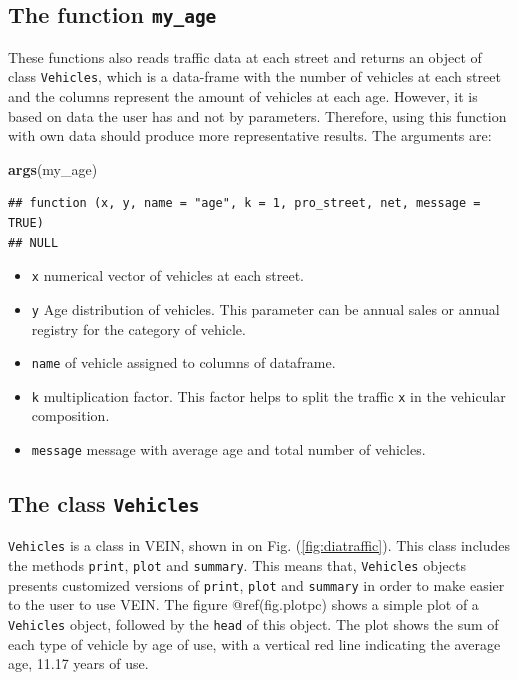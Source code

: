 \documentclass[12pt,graybox,envcountchap,sectrefs]{krantz}
\makeatletter
\newenvironment{Shaded}{\begin{snugshade}}{\end{snugshade}}
\newcommand{\KeywordTok}[1]{\textcolor[rgb]{0.13,0.29,0.53}{\textbf{#1}}}
\newcommand{\NormalTok}[1]{#1}
\providecommand{\tightlist}{%
  \setlength{\itemsep}{0pt}\setlength{\parskip}{0pt}}
\newenvironment{kframe}{%
\medskip{}
\setlength{\fboxsep}{.8em}
 \def\at@end@of@kframe{}%
 \ifinner\ifhmode%
  \def\at@end@of@kframe{\end{minipage}}%
  \begin{minipage}{\columnwidth}%
 \fi\fi%
 \def\FrameCommand##1{\hskip\@totalleftmargin \hskip-\fboxsep
 \colorbox{shadecolor}{##1}\hskip-\fboxsep
     \hskip-\linewidth \hskip-\@totalleftmargin \hskip\columnwidth}%
 \MakeFramed {\advance\hsize-\width
   \@totalleftmargin\z@ \linewidth\hsize
   \@setminipage}}%
 {\par\unskip\endMakeFramed%
 \at@end@of@kframe}
\renewenvironment{Shaded}{\begin{kframe}}{\end{kframe}}
\theoremstyle{definition}
\theoremstyle{definition}
\theoremstyle{definition}
\theoremstyle{remark}
\makeatother
\begin{document}
\subsection{\texorpdfstring{The function
\texttt{my\_age}}{The function my\_age}}\label{the-function-my_age}

These functions also reads traffic data at each street and returns an
object of class \texttt{Vehicles}, which is a data-frame with the number
of vehicles at each street and the columns represent the amount of
vehicles at each age. However, it is based on data the user has and not
by parameters. Therefore, using this function with own data should
produce more representative results. The arguments are:

\begin{Shaded}
\begin{Highlighting}[]
\KeywordTok{args}\NormalTok{(my_age)}
\end{Highlighting}
\end{Shaded}

\begin{verbatim}
## function (x, y, name = "age", k = 1, pro_street, net, message = TRUE) 
## NULL
\end{verbatim}

\begin{itemize}
\tightlist
\item
  \texttt{x} numerical vector of vehicles at each street.
\item
  \texttt{y} Age distribution of vehicles. This parameter can be annual
  sales or annual registry for the category of vehicle.
\item
  \texttt{name} of vehicle assigned to columns of dataframe.
\item
  \texttt{k} multiplication factor. This factor helps to split the
  traffic \texttt{x} in the vehicular composition.
\item
  \texttt{message} message with average age and total number of
  vehicles.
\end{itemize}

\subsection{\texorpdfstring{The class
\texttt{Vehicles}}{The class Vehicles}}\label{the-class-vehicles}

\texttt{Vehicles} is a class in VEIN, shown in on Fig.
(\ref{fig:diatraffic}). This class includes the methods \texttt{print},
\texttt{plot} and \texttt{summary}. This means that, \texttt{Vehicles}
objects presents customized versions of \texttt{print}, \texttt{plot}
and \texttt{summary} in order to make easier to the user to use VEIN.
The figure @ref(fig.plotpc) shows a simple plot of a \texttt{Vehicles}
object, followed by the \texttt{head} of this object. The plot shows the
sum of each type of vehicle by age of use, with a vertical red line
indicating the average age, 11.17 years of use.
\end{document}
